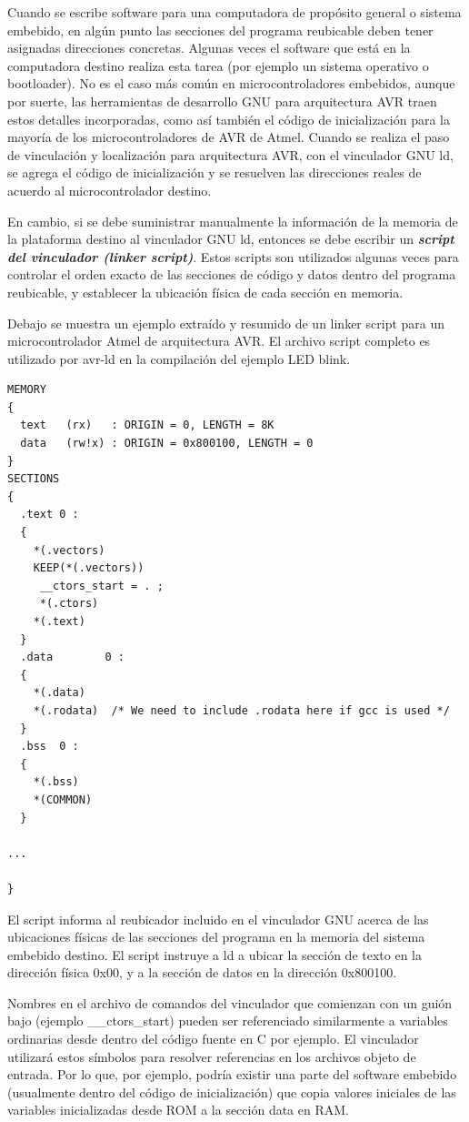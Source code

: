 \documentclass[output=paper, 
colorlinks,
citecolor=brown,
newtxmath
]{langscibook}
\begin{document}
Cuando se escribe software para una computadora de propósito general o
sistema embebido, en algún punto las secciones del programa reubicable
deben tener asignadas direcciones concretas. Algunas veces el software
que está en la computadora destino realiza esta tarea (por ejemplo un sistema
operativo o bootloader). No es el caso más común en microcontroladores
embebidos, aunque por suerte, las herramientas de desarrollo GNU 
para arquitectura AVR traen estos detalles 
incorporadas, como así también el código de inicialización para la mayoría
de los microcontroladores de AVR de Atmel.
Cuando se realiza el paso de vinculación y localización para arquitectura AVR,
con el vinculador GNU ld, se agrega el código de inicialización y se 
resuelven las direcciones reales de acuerdo al microcontrolador destino.

En cambio, si se debe suministrar manualmente la información de la memoria 
de la plataforma destino al vinculador GNU ld, entonces se debe escribir 
un \textit{\textbf{script del vinculador (linker script)}}.
Estos scripts son utilizados algunas veces para controlar el orden exacto de
las secciones de código y datos dentro del programa reubicable, y establecer
la ubicación física de cada sección en memoria.


Debajo se muestra un ejemplo extraído y resumido de un linker script
para un microcontrolador Atmel de arquitectura AVR. El archivo script
completo es utilizado por avr-ld en la compilación del ejemplo LED blink.

\begin{verbatim}
MEMORY
{
  text   (rx)   : ORIGIN = 0, LENGTH = 8K
  data   (rw!x) : ORIGIN = 0x800100, LENGTH = 0
}
SECTIONS
{
  .text 0 :
  {
    *(.vectors)
    KEEP(*(.vectors))
     __ctors_start = . ;
     *(.ctors)
    *(.text)
  }
  .data        0 :
  {
    *(.data)
    *(.rodata)  /* We need to include .rodata here if gcc is used */
  }
  .bss  0 :
  {
    *(.bss)
    *(COMMON)
  }

...

}
\end{verbatim}

El script informa al reubicador incluido en el vinculador GNU acerca de las ubicaciones
físicas de las secciones del programa en la memoria del sistema embebido destino.
El script instruye a ld a ubicar la sección de texto en la dirección física 0x00,
y a la sección de datos en la dirección 0x800100.

Nombres en el archivo de comandos del vinculador que comienzan con un guión bajo
(ejemplo \_\_ctors\_start) pueden ser referenciado similarmente a variables ordinarias
desde dentro del código fuente en C por ejemplo. El vinculador utilizará 
estos símbolos
para resolver referencias en los archivos objeto de entrada.
Por lo que, por ejemplo, podría existir una parte del software embebido (usualmente
dentro del código de inicialización) que copia valores iniciales de las variables
inicializadas desde ROM a la sección data en RAM.
\end{document}
